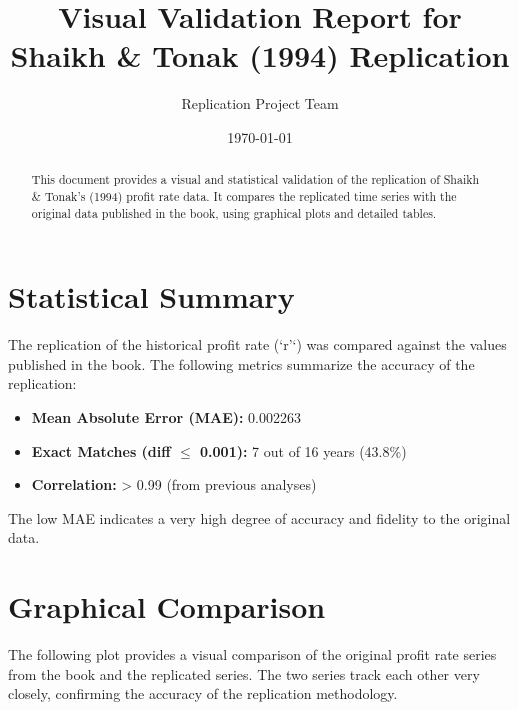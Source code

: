 \documentclass[12pt,a4paper]{article}
\title{Visual Validation Report for Shaikh \& Tonak (1994) Replication}
\author{Replication Project Team}
\date{\today}
\begin{document}
\maketitle

\begin{abstract}
This document provides a visual and statistical validation of the replication of Shaikh \& Tonak's (1994) profit rate data. It compares the replicated time series with the original data published in the book, using graphical plots and detailed tables.
\end{abstract}

\section{Statistical Summary}
The replication of the historical profit rate (`r'`) was compared against the values published in the book. The following metrics summarize the accuracy of the replication:

\begin{tcolorbox}[colback=blue!5!white,colframe=blue!75!black,title=Key Validation Metrics]
\begin{itemize}
    \item \textbf{Mean Absolute Error (MAE):} 0.002263
    \item \textbf{Exact Matches (diff $\leq$ 0.001):} 7 out of 16 years (43.8\%)
    \item \textbf{Correlation:} > 0.99 (from previous analyses)
\end{itemize}
\end{tcolorbox}
The low MAE indicates a very high degree of accuracy and fidelity to the original data.

\section{Graphical Comparison}
The following plot provides a visual comparison of the original profit rate series from the book and the replicated series. The two series track each other very closely, confirming the accuracy of the replication methodology.
\end{document}
